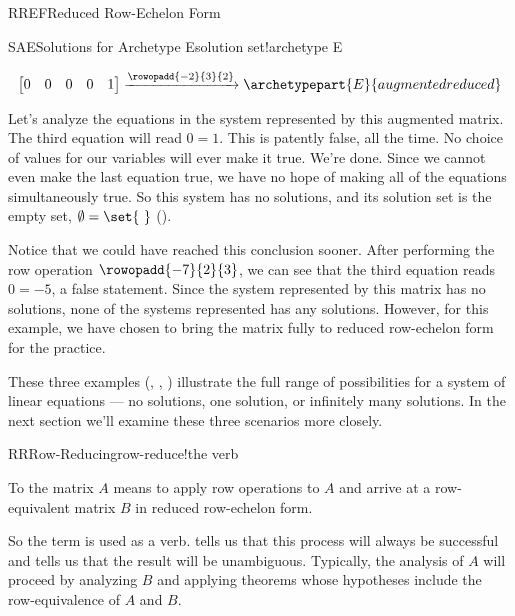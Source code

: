 \begin{subsect}{RREF}{Reduced Row-Echelon Form}
\begin{example}{SAE}{Solutions for Archetype E}{solution set!archetype E}
\begin{para}
\begin{align*}
\begin{bmatrix}
0 & 0 &  0 & 0 &  1
\end{bmatrix}
%
\xrightarrow{\rowopadd{-2}{3}{2}}
\archetypepart{E}{augmentedreduced}\end{align*}
\end{para}
%
\begin{para}Let's analyze the equations in the system represented by this augmented matrix.  The third equation will read $0=1$.  This is patently false, all the time.  No choice of values for our variables will ever make it true.  We're done.  Since we cannot even make the last equation true, we have no hope of making all of the equations simultaneously true.  So this system has no solutions, and its solution set is the empty set, $\emptyset=\set{\ }$ ().\end{para}
%
\begin{para}Notice that we could have reached this conclusion sooner.  After performing the row operation
$\rowopadd{-7}{2}{3}$, we can see that the third equation reads $0=-5$, a false statement.  Since the system represented by this matrix has no solutions, none of the systems represented has any solutions.  However, for this example, we have chosen to bring the matrix fully  to reduced row-echelon form for the practice.\end{para}
\end{example}
%
\begin{para}These three examples
(, , )
illustrate the full range of possibilities for a system of linear equations --- no solutions, one solution, or infinitely many solutions.  In the next section we'll examine these three scenarios more closely.\end{para}
%
\begin{definition}{RR}{Row-Reducing}{row-reduce!the verb}
\begin{para}To  the matrix $A$ means to apply row operations to $A$ and arrive at a row-equivalent matrix $B$ in reduced row-echelon form.\end{para}
\end{definition}
%
\begin{para}So the term  is used as a verb.    tells us that this process will always be successful and  tells us that the result will be unambiguous.  Typically, the analysis of $A$ will proceed by analyzing $B$ and applying theorems whose hypotheses include the row-equivalence of $A$ and $B$.\end{para}
%
%
\end{subsect}
%
